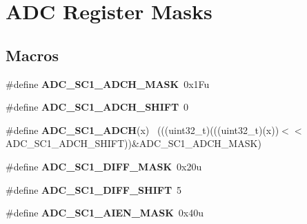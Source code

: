 \hypertarget{group___a_d_c___register___masks}{}\section{A\+D\+C Register Masks}
\label{group___a_d_c___register___masks}
\subsection*{Macros}
\begin{DoxyCompactItemize}
\item 
\hypertarget{group___a_d_c___register___masks_ga7450ced3c2b2df20023c2152f1470640}{}\#define {\bfseries A\+D\+C\+\_\+\+S\+C1\+\_\+\+A\+D\+C\+H\+\_\+\+M\+A\+S\+K}~0x1\+Fu\label{group___a_d_c___register___masks_ga7450ced3c2b2df20023c2152f1470640}

\item 
\hypertarget{group___a_d_c___register___masks_gab2ba46d5132224f2920c1881e2c1b6fe}{}\#define {\bfseries A\+D\+C\+\_\+\+S\+C1\+\_\+\+A\+D\+C\+H\+\_\+\+S\+H\+I\+F\+T}~0\label{group___a_d_c___register___masks_gab2ba46d5132224f2920c1881e2c1b6fe}

\item 
\hypertarget{group___a_d_c___register___masks_ga84ca57710a5589aed16fdd78629a1105}{}\#define {\bfseries A\+D\+C\+\_\+\+S\+C1\+\_\+\+A\+D\+C\+H}(x)                                                ~(((uint32\+\_\+t)(((uint32\+\_\+t)(x))$<$$<$A\+D\+C\+\_\+\+S\+C1\+\_\+\+A\+D\+C\+H\+\_\+\+S\+H\+I\+F\+T))\&A\+D\+C\+\_\+\+S\+C1\+\_\+\+A\+D\+C\+H\+\_\+\+M\+A\+S\+K)\label{group___a_d_c___register___masks_ga84ca57710a5589aed16fdd78629a1105}

\item 
\hypertarget{group___a_d_c___register___masks_gadc514fb491cf08eb3fb0f27298388645}{}\#define {\bfseries A\+D\+C\+\_\+\+S\+C1\+\_\+\+D\+I\+F\+F\+\_\+\+M\+A\+S\+K}~0x20u\label{group___a_d_c___register___masks_gadc514fb491cf08eb3fb0f27298388645}

\item 
\hypertarget{group___a_d_c___register___masks_ga1385c936a9440856068dcb917ed9c658}{}\#define {\bfseries A\+D\+C\+\_\+\+S\+C1\+\_\+\+D\+I\+F\+F\+\_\+\+S\+H\+I\+F\+T}~5\label{group___a_d_c___register___masks_ga1385c936a9440856068dcb917ed9c658}

\item 
\hypertarget{group___a_d_c___register___masks_gaa698d898e077003de10a42184de8f124}{}\#define {\bfseries A\+D\+C\+\_\+\+S\+C1\+\_\+\+A\+I\+E\+N\+\_\+\+M\+A\+S\+K}~0x40u\label{group___a_d_c___register___masks_gaa698d898e077003de10a42184de8f124}


\end{DoxyCompactItemize}
